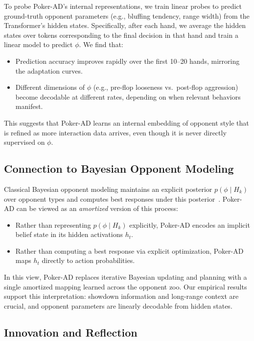 \documentclass{article}
\begin{document}
To probe Poker-AD's internal representations, we train linear probes to predict ground-truth opponent parameters (e.g., bluffing tendency, range width) from the Transformer's hidden states. Specifically, after each hand, we average the hidden states over tokens corresponding to the final decision in that hand and train a linear model to predict $\phi$. We find that:
\begin{itemize}[leftmargin=*]
    \item Prediction accuracy improves rapidly over the first 10--20 hands, mirroring the adaptation curves.
    \item Different dimensions of $\phi$ (e.g., pre-flop looseness vs.\ post-flop aggression) become decodable at different rates, depending on when relevant behaviors manifest.
\end{itemize}
This suggests that Poker-AD learns an internal embedding of opponent style that is refined as more interaction data arrives, even though it is never directly supervised on $\phi$.

\subsection{Connection to Bayesian Opponent Modeling}

Classical Bayesian opponent modeling maintains an explicit posterior $p(\phi \mid H_k)$ over opponent types and computes best responses under this posterior~\citep{southey2005bayesbluff,ganzfried2018bayesian}. Poker-AD can be viewed as an \emph{amortized} version of this process:
\begin{itemize}[leftmargin=*]
    \item Rather than representing $p(\phi \mid H_k)$ explicitly, Poker-AD encodes an implicit belief state in its hidden activations $h_t$.
    \item Rather than computing a best response via explicit optimization, Poker-AD maps $h_t$ directly to action probabilities.
\end{itemize}
In this view, Poker-AD replaces iterative Bayesian updating and planning with a single amortized mapping learned across the opponent zoo. Our empirical results support this interpretation: showdown information and long-range context are crucial, and opponent parameters are linearly decodable from hidden states.

\subsection{Innovation and Reflection}
\end{document}
